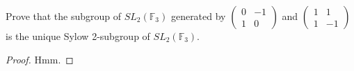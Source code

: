 \begin{exercise}
Prove that the subgroup of $S L_2\left(\mathbb{F}_3\right)$ generated by $\left(\begin{array}{cc}0 & -1 \\ 1 & 0\end{array}\right)$ and $\left(\begin{array}{cc}1 & 1 \\ 1 & -1\end{array}\right)$ is the unique Sylow 2-subgroup of $S L_2\left(\mathbb{F}_3\right)$.
\end{exercise}

\begin{proof}
    Hmm.
\end{proof}









































